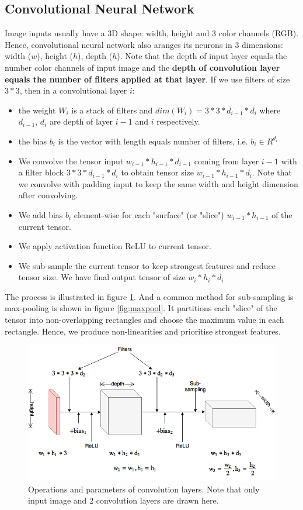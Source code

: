 \subsection{Convolutional Neural Network}
Image inputs usually have a 3D shape: width, height and 3 color channels (RGB). Hence, convolutional neural network also aranges its neurons in 3 dimensions: width ($w$), height ($h$), depth ($h$). Note that the depth of input layer equals the number color channels of input image and the \textbf{depth of convolution layer equals the number of filters applied at that layer}. If we use filters of size $3*3$, then in a convolutional layer $i$:
\begin{itemize}
	\item the weight $W_i$ is a stack of filters and $dim(W_i) = 3*3*d_{i-1}*d_i$ where $d_{i-1}$, $d_i$ are depth of layer $i-1$ and $i$ respectively.
	\item the bias $b_i$ is the vector with length equals number of filters, i.e. $b_i \in R^{d_i}$
	\item We convolve the tensor input $w_{i-1}*h_{i-1}*d_{i-1}$ coming from layer $i-1$ with a filter block $3*3*d_{i-1}*d_{i}$ to obtain tensor size $w_{i-1}*h_{i-1}*d_{i}$. Note that we convolve with padding input to keep the same width and height dimension after convolving.
	\item We add bias $b_i$ element-wise for each "surface" (or "slice") $w_{i-1}*h_{i-1}$ of the current tensor.
	\item We apply activation function ReLU to current tensor.
	\item We sub-sample the current tensor to keep strongest features and reduce tensor size. We have final output tensor of size $w_i * h_i *d_i$
\end{itemize}  
The process is illustrated in figure \ref{fig:convNetsimple}. And a common method for sub-sampling is max-pooling is shown in figure \ref{fig:maxpool}. It partitions each "slice" of the tensor into non-overlapping rectangles and choose the maximum value in each rectangle. Hence, we produce non-linearities and prioritise strongest features.
\begin{figure}[tb]
	\centering
	\includegraphics[width=0.9\hsize]{./figures/convNetsimple}
	\caption{Operations and parameters of convolution layers. Note that only input image and 2 convolution layers are drawn here.}
	\label{fig:convNetsimple}
\end{figure}
